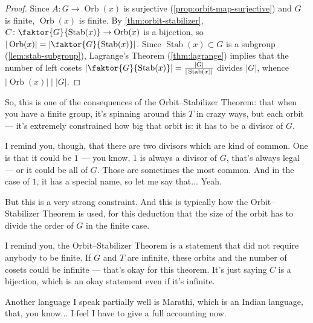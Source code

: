 \begin{content}
\begin{center}
\end{center}

\begin{proof}
Since $A \colon G \to \operatorname{Orb}(x)$ is surjective (\cref{prop:orbit-map-surjective}) and $G$ is finite, $\operatorname{Orb}(x)$ is finite. By \cref{thm:orbit-stabilizer}, $C \colon \faktor{G}{\operatorname{Stab}(x)} \to \operatorname{Orb}(x)$ is a bijection, so $|\operatorname{Orb}(x)| = \left| \faktor{G}{\operatorname{Stab}(x)} \right|$. Since $\operatorname{Stab}(x) \subset G$ is a subgroup (\cref{lem:stab-subgroup}), Lagrange's Theorem (\cref{thm:lagrange}) implies that the number of left cosets $\left| \faktor{G}{\operatorname{Stab}(x)} \right| = \frac{|G|}{|\operatorname{Stab}(x)|}$ divides $|G|$, whence $|\operatorname{Orb}(x)| \;\big|\; |G|$.
\end{proof}
\end{content}

\begin{speech}[00:38:21 - 00:39:58]
So, this is one of the consequences of the Orbit--Stabilizer Theorem: that when you have a finite group, it's spinning around this $T$ in crazy ways, but each orbit --- it's extremely constrained how big that orbit is: it has to be a divisor of $G$.

I remind you, though, that there are two divisors which are kind of common. One is that it could be $1$ --- you know, $1$ is always a divisor of $G$, that's always legal --- or it could be all of $G$. Those are sometimes the most common. And in the case of $1$, it has a special name, so let me say that... Yeah.

But this is a very strong constraint. And this is typically how the Orbit--Stabilizer Theorem is used, for this deduction that the size of the orbit has to divide the order of $G$ in the finite case.

I remind you, the Orbit--Stabilizer Theorem is a statement that did not require anybody to be finite. If $G$ and $T$ are infinite, these orbits and the number of cosets could be infinite --- that's okay for this theorem. It's just saying $C$ is a bijection, which is an okay statement even if it's infinite.

Another language I speak partially well is Marathi, which is an Indian language, that, you know...  I feel I have to give a full accounting now.
\end{speech}


